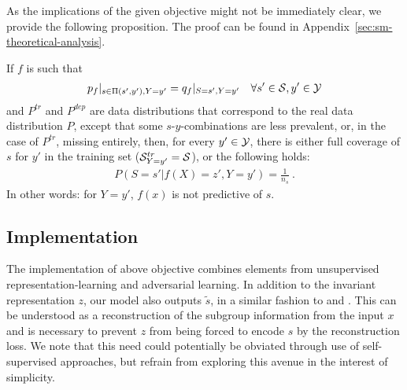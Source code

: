 As the implications of the given objective might not be immediately clear,
we provide the following proposition.
%
The proof can be found in Appendix~\ref{sec:sm-theoretical-analysis}.
%
\begin{theorem}
%
If \(f\) is such that
%
\begin{align}
p_f|_{s\in \Pi(s',y'),Y=y'} = q_f|_{S=s',Y=y'}\quad\forall s'\in{\mathcal{S}}, y' \in{\mathcal{Y}}
\end{align}
%
and \(P^{tr}\) and \(P^{dep}\) are data
distributions that correspond to the real data distribution \(P\),
except that some \(s\)-\(y\)-combinations are less prevalent, or, in the
case of \(P^{tr}\), missing entirely, then, for every
\(y' \in {\mathcal{Y}}\), there is either full coverage of \(s\) for \(y'\)
in the training set (\( {\mathcal{S}}^{tr}_{ Y=y' }={\mathcal{S}} \)), or the
following holds:
%
\begin{align}
P(S=s'|f(X)=z', Y=y')=\frac{1}{n_s}~.
\end{align}
%
In other words: for \(Y=y'\), \(f(x)\) is not predictive of \(s\).
\end{theorem}

\subsection{Implementation}\label{ssec:sm-realisation}
%
The implementation of above objective combines elements from unsupervised representation-learning and
adversarial learning.
In addition to the invariant representation $z$, our model also outputs $\tilde{s}$, in a similar
fashion to \citet{KehBarThoQua20} and \citet{creager2019flexibly}. 
%
This can be understood as a reconstruction of the subgroup information from the input $x$ and is
necessary to prevent $z$ from being forced to encode $s$ by the reconstruction loss.
%
We note that this need could potentially be obviated through use of self-supervised approaches,
but refrain from exploring this avenue in the interest of simplicity.

